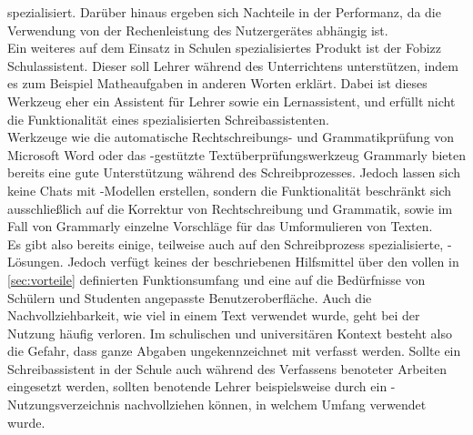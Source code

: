 \documentclass[../main.tex]{subfiles}
\begin{document}
spezialisiert. Darüber hinaus ergeben sich Nachteile in der Performanz, da die Verwendung von der Rechenleistung des Nutzergerätes abhängig ist.\cite{ollamaSchreibassi}\\
Ein weiteres auf dem Einsatz in Schulen spezialisiertes Produkt ist der Fobizz Schulassistent. Dieser soll Lehrer während des Unterrichtens unterstützen, indem es zum Beispiel 
Matheaufgaben in anderen Worten erklärt. Dabei ist dieses Werkzeug eher ein Assistent für Lehrer sowie ein Lernassistent, und erfüllt nicht die Funktionalität eines spezialisierten 
Schreibassistenten.\cite{fobizz}\\ 
Werkzeuge wie die automatische Rechtschreibungs- und Grammatikprüfung von Microsoft Word oder das -gestützte Textüberprüfungswerkzeug Grammarly bieten bereits eine gute 
Unterstützung während des Schreibprozesses. Jedoch lassen sich keine Chats mit -Modellen erstellen, sondern die Funktionalität beschränkt sich ausschließlich auf die Korrektur von 
Rechtschreibung und Grammatik, sowie im Fall von Grammarly einzelne Vorschläge für das Umformulieren von Texten.\cite{microsoftword,grammarly}\\
Es gibt also bereits einige, teilweise auch auf den Schreibprozess spezialisierte, -Lösungen. Jedoch verfügt keines der beschriebenen Hilfsmittel über den vollen in \autoref{sec:vorteile}
definierten Funktionsumfang und eine auf die Bedürfnisse von Schülern und Studenten angepasste Benutzeroberfläche. Auch die Nachvollziehbarkeit, wie viel  in einem Text verwendet 
wurde, geht bei der Nutzung häufig verloren. Im schulischen und universitären Kontext besteht also die Gefahr, dass ganze Abgaben ungekennzeichnet mit  verfasst werden. Sollte ein 
Schreibassistent in der Schule auch während des Verfassens benoteter Arbeiten eingesetzt werden, sollten benotende Lehrer beispielsweise durch ein -Nutzungsverzeichnis 
nachvollziehen können, in welchem Umfang  verwendet wurde.
\end{document}
